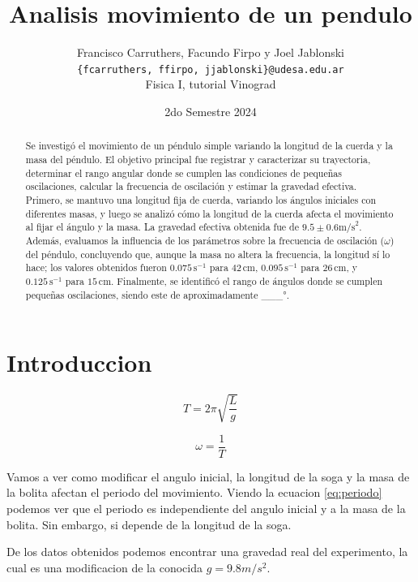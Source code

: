 \documentclass[12pt,a4]{article}
\title{Analisis movimiento de un pendulo}
\author{Francisco Carruthers, Facundo Firpo y Joel Jablonski\\ [2mm]
\small \texttt{\{fcarruthers, ffirpo, jjablonski\}@udesa.edu.ar}\\
\small Fisica I, tutorial Vinograd}
\date{2do Semestre 2024}
\begin{document}
\maketitle

\begin{abstract}
    Se investigó el movimiento de un péndulo simple variando la longitud de la cuerda y la masa del péndulo. El objetivo principal fue registrar y caracterizar su trayectoria, determinar el rango angular donde se cumplen las condiciones de pequeñas oscilaciones, calcular la frecuencia de oscilación y estimar la gravedad efectiva. Primero, se mantuvo una longitud fija de cuerda, variando los ángulos iniciales con diferentes masas, y luego se analizó cómo la longitud de la cuerda afecta el movimiento al fijar el ángulo y la masa. La gravedad efectiva obtenida fue de $9.5 \pm 0.6 \text{m/s}^2$. Además, evaluamos la influencia de los parámetros sobre la frecuencia de oscilación ($\omega$) del péndulo, concluyendo que, aunque la masa no altera la frecuencia, la longitud sí lo hace; los valores obtenidos fueron $0.075 \, \text{s}^{-1}$ para $42 \, \text{cm}$, $0.095 \, \text{s}^{-1}$ para $26 \, \text{cm}$, y $0.125 \, \text{s}^{-1}$ para $15 \, \text{cm}$. Finalmente, se identificó el rango de ángulos donde se cumplen pequeñas oscilaciones, siendo este de aproximadamente \_\_\_°.

\end{abstract}

\section{Introduccion}

\begin{equation}
    T = 2 \pi \sqrt{\frac{L}{g}}
    \label{eq:periodo}
\end{equation}

\begin{equation}
    \omega = \frac{1}{T}
    \label{eq:omega}
\end{equation}

Vamos a ver como modificar el angulo inicial, la longitud de la soga y la masa de la bolita afectan el periodo del movimiento. Viendo la ecuacion \ref{eq:periodo} podemos ver que el periodo es independiente del angulo inicial y a la masa de la bolita. Sin embargo, si depende de la longitud de la soga. 

De los datos obtenidos podemos encontrar una gravedad real del experimento, la cual es una modificacion de la conocida $g = 9.8 m/s^2$.
\end{document}
